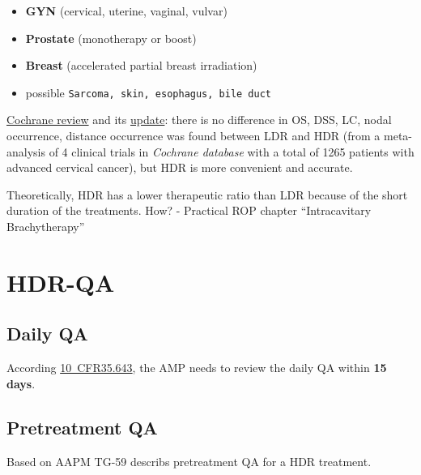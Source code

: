 \documentclass[]{book}
\providecommand{\tightlist}{%
  \setlength{\itemsep}{0pt}\setlength{\parskip}{0pt}}
\theoremstyle{definition}
\theoremstyle{definition}
\theoremstyle{definition}
\theoremstyle{remark}
\begin{document}
\begin{itemize}
\tightlist
\item
  \textbf{GYN} (cervical, uterine, vaginal, vulvar)
\item
  \textbf{Prostate} (monotherapy or boost)
\item
  \textbf{Breast} (accelerated partial breast irradiation)
\item
  possible \texttt{Sarcoma,\ skin,\ esophagus,\ bile\ duct}
\end{itemize}

\href{http://cochranelibrary-wiley.com/doi/10.1002/14651858.CD007563.pub2/abstract}{Cochrane
review} and its
\href{https://www.ncbi.nlm.nih.gov/m/pubmed/25300170/?i=5\&from=/10432431/related}{update}:
there is no difference in OS, DSS, LC, nodal occurrence, distance
occurrence was found between LDR and HDR (from a meta-analysis of 4
clinical trials in \emph{Cochrane database} with a total of 1265
patients with advanced cervical cancer), but HDR is more convenient and
accurate.

Theoretically, HDR has a lower therapeutic ratio than LDR because of the
short duration of the treatments. How? - Practical ROP chapter
``Intracavitary Brachytherapy''

\section{HDR-QA}\label{hdr-qa}

\subsection{Daily QA}\label{daily-qa}

According
\href{https://www.nrc.gov/reading-rm/doc-collections/cfr/part035/part035-0643.html}{10~CFR35.643},
the AMP needs to review the daily QA within \textbf{15 days}.

\subsection{Pretreatment QA}\label{pretreatment-qa}

Based on AAPM TG-59 describs pretreatment QA for a HDR treatment.
\end{document}
